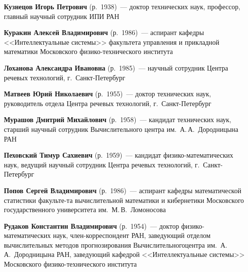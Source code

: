 \begin{multicols}{2}
\vspace*{4pt}

\noindent
\textbf{Кузнецов Игорь Петрович} (р.\ 1938)~--- 
доктор технических наук, профессор, главный научный сотрудник ИПИ РАН

\vspace*{4pt}

\noindent
\textbf{Куракин Алексей Владимирович} (р.\ 1986)~--- аспирант кафедры 
<<Интеллектуальные системы>> факультета управления и прикладной математики 
Московского физико-технического института

\vspace*{4pt}

\noindent
\textbf{Лоханова Александра Ивановна} (р.\ 1985)~--- научный сотрудник 
Центра речевых технологий, г.~Санкт-Пе\-тер\-бург

\vspace*{4pt}

\noindent
\textbf{Матвеев Юрий Николаевич} (р.\ 1955)~--- 
доктор технических наук, руководитель отдела Центра речевых технологий, 
г.~Санкт-Пе\-тер\-бург

\vspace*{4pt}

\noindent
\textbf{Мурашов Дмитрий Михайлович} (р.\ 1958)~--- кандидат технических наук, 
старший научный сотрудник Вычислительного центра им.~А.\,А.~Дородницына РАН 

\vspace*{4pt}

\noindent
\textbf{Пеховский Тимур Сахиевич} (р.\ 1959)~--- 
кандидат фи\-зи\-ко-математических наук, ведущий научный сотрудник Центра 
речевых технологий, г.~Санкт-Пе\-тер\-бург

\vspace*{4pt}

\noindent
\textbf{Попов Сергей Владимирович} (р.\ 1986)~--- аспирант кафедры 
математической статистики факульте-\linebreak та вычисли\-тельной математики и 
кибернетики Московского государственного университета им.~М.\,В.~Ломоносова

\pagebreak


\noindent
\textbf{Рудаков Константин Владимирович} (р.\ 1954)~--- 
доктор физико-математических наук, 
член-коррес\-пон\-дент РАН, заведующий 
отделом вычислительных методов прогнозирования Вычислительного\linebreak центра 
им.\ А.\,А.~Дородницына РАН, за\-ве\-ду\-ющий кафедрой <<Интеллектуальные системы>> 
Московского фи\-зи\-ко-тех\-ни\-че\-ско\-го института


\end{multicols}
